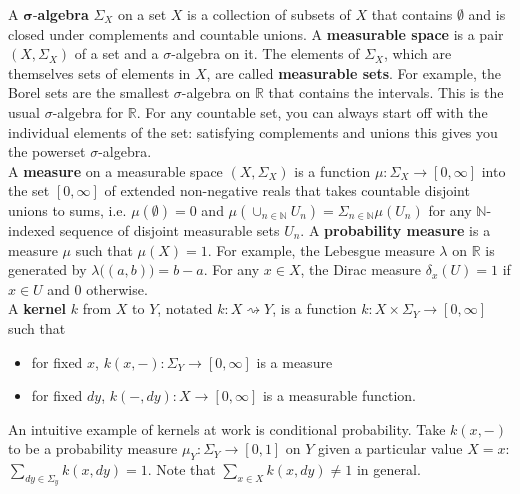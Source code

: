 \documentclass[11pt]{article}
\theoremstyle{definition}
\theoremstyle{plain}
\renewcommand{\b}[1]{\mathbb{#1}}
\begin{document}
\noindent A $\mathbf{\sigma}$-\textbf{algebra} $\Sigma_X$ on a set $X$ is a collection
of subsets of $X$ that contains $\emptyset$ and is closed under complements
and countable unions. A \textbf{measurable space} is a pair $(X,\Sigma_X)$ of
a set and a $\sigma$-algebra on it. The elements of $\Sigma_X$, which are themselves
sets of elements in $X$, are called \textbf{measurable sets}.
For example, the Borel sets are the smallest $\sigma$-algebra on $\b{R}$ that
contains the intervals. This is the usual $\sigma$-algebra for $\b{R}$. For any countable
set, you can always start off with the individual elements of the set: satisfying
complements and unions this gives you the powerset $\sigma$-algebra.\\

\noindent A \textbf{measure} on a measurable space $(X,\Sigma_X)$ is a function
$\mu: \Sigma_X \rightarrow [0,\infty]$ into the set $[0,\infty]$ of extended
non-negative reals that takes countable disjoint unions to sums, i.e. $\mu(\emptyset)=0$
and $\mu(\cup_{n \in \b{N}} U_n) = \Sigma_{n \in \b{N}} \mu(U_n)$ 
for any $\b{N}$-indexed sequence of disjoint measurable sets $U_n$.
A \textbf{probability measure} is a measure $\mu$ such that $\mu(X)=1$.
For example, the Lebesgue measure $\lambda$ on $\b{R}$ is generated by
$\lambda \Big( (a,b) \Big) = b-a$. For any $x \in X$, the Dirac measure 
$\delta_x(U) = 1$ if $x \in U$ and $0$ otherwise.\\

\noindent A \textbf{kernel} $k$ from $X$ to $Y$, notated
$k: X \rightsquigarrow Y$, is a function $k: X \times \Sigma_Y \rightarrow [0,\infty]$
such that

\begin{itemize}
    \item for fixed $x$, $k(x,-): \Sigma_Y \rightarrow [0,\infty]$ is a measure
    \item for fixed $dy$, $k(-,dy): X \rightarrow [0,\infty]$ is a measurable function.
\end{itemize}

\noindent An intuitive example of kernels at work is conditional probability.
Take $k(x,-)$ to be a probability measure $\mu_Y: \Sigma_Y \rightarrow [0,1]$ on $Y$ given a particular value $X=x$:
$\sum_{dy \in \Sigma_y} k(x,dy) = 1$. Note that $\sum_{x \in X} k(x,dy) \neq 1$ in general.\\

\end{document}
